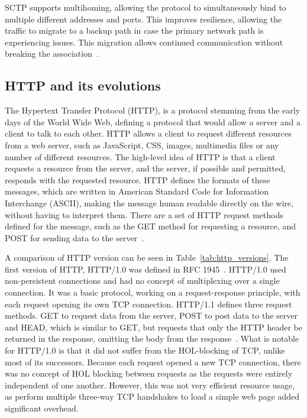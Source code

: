 \documentclass[english, 12pt, a4paper, elec, utf8, a-2b, online]{aaltothesis}
\begin{document}
SCTP supports multihoming, allowing the protocol to simultaneously bind to multiple
different addresses and ports. This improves resilience, allowing the traffic to migrate
to a backup path in case the primary network path is experiencing issues. This migration
allows continued communication without breaking the association~\cite{rfc9260}.

\subsection{HTTP and its evolutions}

The Hypertext Transfer Protocol (HTTP), is a protocol stemming from the early days 
of the World Wide Web, defining a protocol that would allow a server and a client
to talk to each other. HTTP allows a client to request different resources from a 
web server, such as JavaScript, CSS, images, multimedia files or any number of different resources.
The high-level idea of HTTP is that a client requests a resource from the server,
and the server, if possible and permitted, responds with the requested resource.
HTTP defines the formats of these messages, which are written in American Standard Code for Information Interchange (ASCII),
making the message human readable directly on the wire, without having to interpret 
them. There are a set of HTTP request methods defined for the message, such as
the GET method for requesting a resource, and POST for sending data to the server~\cite{compute_rnetworking}.

A comparison of HTTP version can be seen in Table~\ref{tab:http_versions}. 
The first version of HTTP, HTTP/1.0 was defined in RFC 1945~\cite{rfc1945}. HTTP/1.0
used non-persistent connections and had no concept of multiplexing over a single connection.
It was a basic protocol, working on a request-response principle, with each request opening
its own TCP connection. HTTP/1.1 defines three request methods. GET to request data
from the server, POST to post data to the server and HEAD, which is similar to GET,
but requests that only the HTTP header be returned in the response, omitting the
body from the response~\cite{rfc1945}. What is notable for HTTP/1.0 is that it
did not suffer from the HOL-blocking of TCP, unlike most of its successors. Because each
request opened a new TCP connection, there was no concept of HOL blocking between requests as the
requests were entirely independent of one another. However, this was not very efficient
resource usage, as perform multiple three-way TCP handshakes to load a simple web page
added significant overhead.
\end{document}
